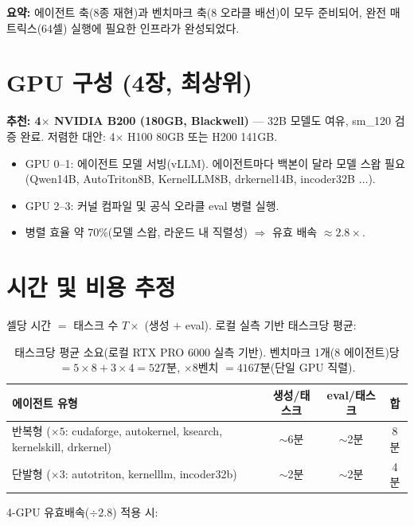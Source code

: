 \documentclass[11pt]{article}
\begin{document}
\noindent\textbf{요약:} 에이전트 축(8종 재현)과 벤치마크 축(8 오라클 배선)이 모두 준비되어,
완전 매트릭스(64셀) 실행에 필요한 인프라가 완성되었다.

\section{GPU 구성 (4장, 최상위)}
\textbf{추천: 4$\times$ NVIDIA B200 (180GB, Blackwell)} --- 32B 모델도 여유, sm\_120 검증 완료.
저렴한 대안: 4$\times$ H100 80GB 또는 H200 141GB.
\begin{itemize}
  \item GPU 0--1: 에이전트 모델 서빙(vLLM). 에이전트마다 백본이 달라 모델 스왑 필요
        (Qwen14B, AutoTriton8B, KernelLLM8B, drkernel14B, incoder32B $\dots$).
  \item GPU 2--3: 커널 컴파일 및 공식 오라클 eval 병렬 실행.
  \item 병렬 효율 약 70\%(모델 스왑, 라운드 내 직렬성) $\Rightarrow$ 유효 배속 $\approx 2.8\times$.
\end{itemize}

\section{시간 및 비용 추정}
셀당 시간 $=$ 태스크 수 $T \times$ (생성 $+$ eval). 로컬 실측 기반 태스크당 평균:

\begin{table}[h]
\centering
\begin{tabular}{@{}lccc@{}}
\toprule
\textbf{에이전트 유형} & \textbf{생성/태스크} & \textbf{eval/태스크} & \textbf{합} \\
\midrule
반복형 ($\times 5$: cudaforge, autokernel, ksearch, kernelskill, drkernel) & $\sim$6분 & $\sim$2분 & 8분 \\
단발형 ($\times 3$: autotriton, kernelllm, incoder32b)                      & $\sim$2분 & $\sim$2분 & 4분 \\
\bottomrule
\end{tabular}
\caption{태스크당 평균 소요(로컬 RTX PRO 6000 실측 기반). 벤치마크 1개(8 에이전트)당
$= 5\times8 + 3\times4 = 52T$분, $\times 8$벤치 $= 416T$분(단일 GPU 직렬).}
\end{table}

4-GPU 유효배속($\div 2.8$) 적용 시:
\end{document}
